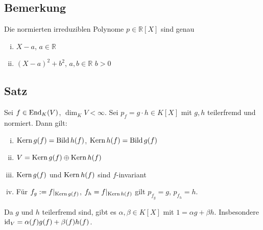 \subsection[Bemerkung: Liste der irreduziblen Polynome in {\protect $\mathds{R}[X]$}]{Bemerkung} %
\label{sub:11.2}
Die normierten irreduziblen Polynome $p \in \mathds{R}[X]$ sind genau
\begin{enumerate}[(i)]
	\item $X-a$, \enspace$a \in \mathds{R}$
	\item $(X-a)^2 + b^2$, \enspace$a,b \in \mathds{R}$ $b>0$
\end{enumerate}

\subsection[Satz über Zerlegung des Minimalpolynoms in teilerfremde Polynome]{Satz} %
\label{sub:11.3}
Sei $f \in \operatorname{End}_K(V)$, $\dim_K V < \infty$. Sei $p_f = g \cdot h \in K[X]$ mit $g,h$ teilerfremd und normiert. Dann gilt:
\begin{enumerate}[(i)]
	\item $\operatorname{Kern} g(f) = \operatorname{Bild} h(f)$, $\operatorname{Kern} h(f) = \operatorname{Bild} g(f)$
	\item $V= \operatorname{Kern} g(f) \oplus \operatorname{Kern} h(f)$
	\item $\operatorname{Kern} g(f)$ und $\operatorname{Kern} h(f)$ sind $f$-invariant
	\item Für $f_g := f|_{\operatorname{Kern} g(f)}$, $f_h = f|_{\operatorname{Kern} h(f)}$ gilt $p_{f_g} = g$, $p_{f_h}=h$.
\end{enumerate}
Da $g$ und $h$ teilerfremd sind, gibt es $\alpha, \beta \in K[X]$ mit $1= \alpha g + \beta h$. Insbesondere $\operatorname{id}_V = \alpha(f) g(f) + \beta(f) h(f)$.
